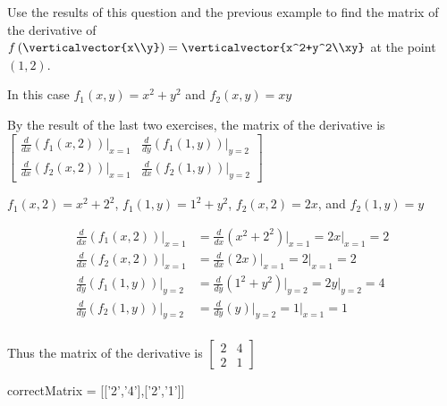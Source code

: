\documentclass{ximera}
\begin{document}
\begin{question}
	Use the results of this question and the previous example  to find the matrix of the derivative of  $f\left(\verticalvector{x\\y}\right) = \verticalvector{x^2+y^2\\xy}$
	at the point \((1,2)\).
	\begin{solution}
		\begin{hint}
			In this case  $f_1(x,y) = x^2+y^2$ and $f_2(x,y) = xy$
		\end{hint}
		\begin{hint}
			By the result of the last two exercises, the matrix of the derivative is \(\begin{bmatrix} \frac{d}{dx}(f_1(x,2))\big|_{x=1} & \frac{d}{dy}(f_1(1,y))\big|_{y=2}
			\\ \frac{d}{dx}(f_2(x,2))\big|_{x=1} & \frac{d}{dx}(f_2(1,y))\big|_{y=2}\end{bmatrix}\)
		\end{hint}
		\begin{hint}
			$f_1(x,2) = x^2+2^2$,  $f_1(1,y) = 1^2+y^2$,  $f_2(x,2) = 2x$, and $f_2(1,y) = y$
		\end{hint}
		\begin{hint}
			\begin{align*}	
			\frac{d}{dx}(f_1(x,2))\big|_{x=1} &= \frac{d}{dx} \left( x^2+2^2\right)\big|_{x=1} = 2x\big|_{x=1}=2\\
			\frac{d}{dx}(f_2(x,2))\big|_{x=1} &= \frac{d}{dx} \left( 2x\right)\big|_{x=1} = 2\big|_{x=1}=2\\
			\frac{d}{dy}(f_1(1,y))\big|_{y=2} &= \frac{d}{dy} \left( 1^2+y^2\right)\big|_{y=2} = 2y\big|_{y=2}=4\\
			\frac{d}{dy}(f_2(1,y))\big|_{y=2} &= \frac{d}{dy} \left(y\right)\big|_{y=2} = 1\big|_{x=1}=1\\
			\end{align*}
		\end{hint}
		\begin{hint}
			Thus the matrix of the derivative is \(\begin{bmatrix} 2&4\\2&1 \end{bmatrix}\)
		\end{hint}
		\begin{matrix-answer}
			correctMatrix = [['2','4'],['2','1']]
		\end{matrix-answer}
	\end{solution}
\end{question}
\end{document}
